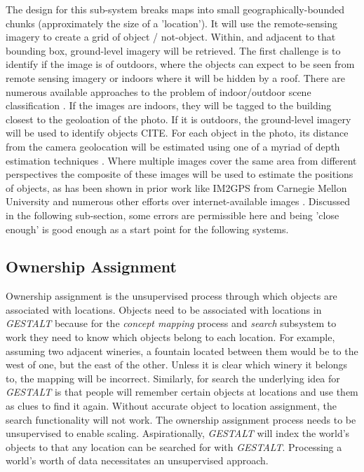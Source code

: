 The design for this sub-system breaks maps into small geographically-bounded chunks (approximately the size of a 'location'). 
It will use the remote-sensing imagery to create a grid of object / not-object. Within, and adjacent to that bounding box, ground-level imagery will be retrieved. 
The first challenge is to identify if the image is of outdoors, where the objects can expect to be seen from remote sensing imagery or indoors where it will be hidden by a roof. There are numerous available approaches to the problem of indoor/outdoor scene classification \cite{Tong2017}. 
If the images are indoors, they will be tagged to the building closest to the geoloation of the photo. 
If it is outdoors, the ground-level imagery will be used to identify objects CITE. For each object in the photo, its distance from the camera geolocation will be estimated using one of a myriad of depth estimation techniques \cite{Ming2021,Liu2020}. 
Where multiple images cover the same area from different perspectives the composite of these images will be used to estimate the positions of objects, as has been shown in prior work like IM2GPS from Carnegie Mellon University \cite{Hays2008} and numerous other efforts over internet-available images \cite{Snavley2011}. 
Discussed in the following sub-section, some errors are permissible here and being 'close enough' is good enough as a start point for the following systems. 

\subsection{Ownership Assignment}
Ownership assignment is the unsupervised process through which objects are associated with locations. 
Objects need to be associated with locations in \textit{GESTALT} because for the \textit{concept mapping} process and \textit{search} subsystem to work they need to know which objects belong to each location.
For example, assuming two adjacent wineries, a fountain located between them would be to the west of one, but the east of the other. Unless it is clear which winery it belongs to, the mapping will be incorrect. 
Similarly, for search the underlying idea for \textit{GESTALT} is that people will remember certain objects at locations and use them as clues to find it again. Without accurate object to location assignment, the search functionality will not work. 
The ownership assignment process needs to be unsupervised to enable scaling. Aspirationally, \textit{GESTALT} will index the world's objects to that any location can be searched for with \textit{GESTALT}. Processing a world's worth of data necessitates an unsupervised approach. 

